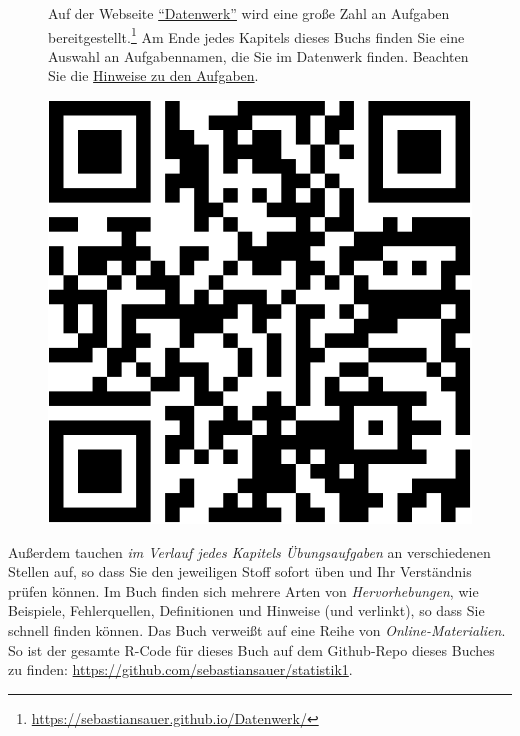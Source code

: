 \documentclass[
  letterpaper,
  oneside,
  open=any]{scrbook}
\theoremstyle{definition}
\theoremstyle{definition}
\theoremstyle{definition}
\theoremstyle{remark}
\begin{document}
\begin{figure}

\begin{minipage}{0.80\linewidth}
Auf der Webseite
\href{https://sebastiansauer.github.io/Datenwerk/}{\enquote{Datenwerk}}
wird eine große Zahl an Aufgaben bereitgestellt.\footnote{\url{https://sebastiansauer.github.io/Datenwerk/}}
Am Ende jedes Kapitels dieses Buchs finden Sie eine Auswahl an
Aufgabennamen, die Sie im Datenwerk finden. Beachten Sie die
\href{https://sebastiansauer.github.io/Datenwerk/hinweise}{Hinweise zu
den Aufgaben}.\end{minipage}%
%
\begin{minipage}{0.20\linewidth}

\begin{center}
\includegraphics[width=0.75\linewidth,height=\textheight,keepaspectratio]{005-orga_files/figure-pdf/unnamed-chunk-4-1.pdf}
\end{center}

\end{minipage}%

\end{figure}%

Außerdem tauchen \emph{im Verlauf jedes Kapitels Übungsaufgaben} an
verschiedenen Stellen auf, so dass Sie den jeweiligen Stoff sofort üben
und Ihr Verständnis prüfen können. Im Buch finden sich mehrere Arten von
\emph{Hervorhebungen}, wie Beispiele, Fehlerquellen, Definitionen und
Hinweise (und verlinkt), so dass Sie schnell finden können. Das Buch
verweißt auf eine Reihe von \emph{Online-Materialien}. So ist der
gesamte R-Code für dieses Buch auf dem Github-Repo dieses Buches zu
finden: \url{https://github.com/sebastiansauer/statistik1}.
\end{document}
